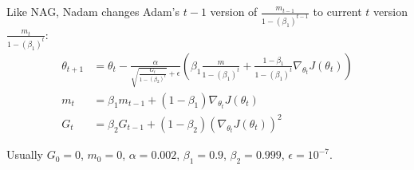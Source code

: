 Like NAG, Nadam changes Adam's $t-1$ version of $\displaystyle \frac{m_{t-1}}{1-(\beta_1)^{t-1}}$ to current $t$ version $\displaystyle \frac{m_t}{1-(\beta_1)^t}$:
\begin{equation}
    \begin{aligned}
            \theta_{t+1} &= \theta_t - \frac{\alpha}{\sqrt{\displaystyle \frac{G_t}{1-(\beta_2)^t}} + \epsilon} \left(\beta_1 \frac{m}{1-(\beta_1)^t} + \frac{1-\beta_1}{1-(\beta_1)^t} \nabla_{\theta_t} J(\theta_t) \right)  \\
        m_t &= \beta_1 m_{t-1} + (1-\beta_1) \nabla_{\theta_t} J(\theta_t) \\
        G_t &= \beta_2 G_{t-1} + (1-\beta_2) \left(\nabla_{\theta_t} J(\theta_t) \right)^2    
    \end{aligned}
\end{equation}

Usually $G_0 = 0$, $m_0 = 0$, $\alpha = 0.002$, $\beta_1 = 0.9$, $\beta_2 = 0.999$, $\epsilon = 10^{-7}$.





